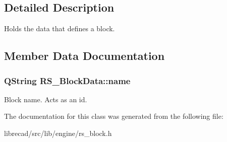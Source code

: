 \subsection{Detailed Description}
Holds the data that defines a block. 

\subsection{Member Data Documentation}
\hypertarget{classRS__BlockData_aab3251685c8c1e3ceb0b24d1f0b0c333}{
\subsubsection[{name}]{\setlength{\rightskip}{0pt plus 5cm}Q\-String R\-S\-\_\-\-Block\-Data\-::name}}\label{classRS__BlockData_aab3251685c8c1e3ceb0b24d1f0b0c333}
Block name. Acts as an id. 

The documentation for this class was generated from the following file\-:\begin{DoxyCompactItemize}
\item 
librecad/src/lib/engine/rs\-\_\-block.\-h\end{DoxyCompactItemize}
